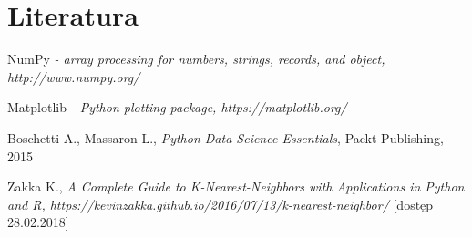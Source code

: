 \documentclass[10pt,a4paper]{article}
\begin{document}
\section{Literatura}
\begin{thebibliography}{9}
		
	NumPy 
	\textit{- array processing for numbers, strings, records, and object, http://www.numpy.org/}
	
	Matplotlib 
	\textit{- Python plotting package, https://matplotlib.org/}
	
	Boschetti A., Massaron L.,
	\textit{Python Data Science Essentials}, Packt Publishing, 2015 
	
	Zakka K., \textit{A Complete Guide to K-Nearest-Neighbors with Applications in Python and R, https://kevinzakka.github.io/2016/07/13/k-nearest-neighbor/} [dostęp 28.02.2018]

\end{thebibliography}
\end{document}
